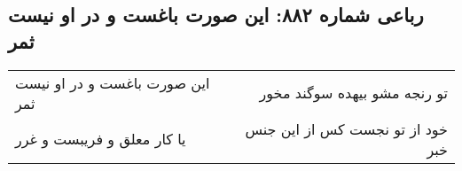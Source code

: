 \begin{center}
\section*{رباعی شماره ۸۸۲: این صورت باغست و در او نیست ثمر}
\label{sec:0882}
\begin{longtable}{l p{0.5cm} r}
این صورت باغست و در او نیست ثمر
&&
تو رنجه مشو بیهده سوگند مخور
\\
یا کار معلق و فریبست و غرر
&&
خود از تو نجست کس از این جنس خبر
\\
\end{longtable}
\end{center}
